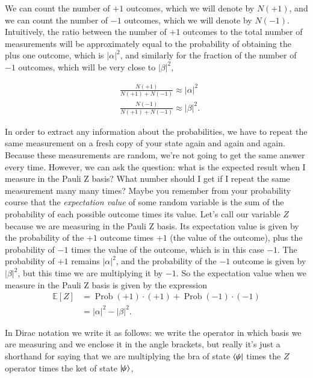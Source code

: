 We can count the number of $+1$ outcomes, which we will denote by $N(+1)$, and we can count the number of $-1$ outcomes, which we will denote by $N(-1)$. Intuitively, the ratio between the number of $+1$ outcomes to the total number of measurements will be approximately equal to the probability of obtaining the plus one outcome, which is $|\alpha|^2$, and similarly for the fraction of the number of $-1$ outcomes, which will be very close to $|\beta|^2$,

\begin{equation}
\begin{aligned}
&\frac{N(+1)}{N(+1)+N(-1)} \approx|\alpha|^{2} \\
&\frac{N(-1)}{N(+1)+N(-1)} \approx|\beta|^{2}.
\end{aligned}
\end{equation}

In order to extract any information about the probabilities, we have to repeat the same measurement on a fresh copy of your state again and again and again. Because these measurements are random, we're not going to get the same answer every time. However, we can ask the question: what is the expected result when I measure in the Pauli Z basis? What number should I get if I repeat the same measurement many many times? Maybe you remember from your probability course that the \emph{expectation value} of some random variable is the sum of the probability of each possible outcome times its value. Let's call our variable $Z$ because we are measuring in the Pauli Z basis.  Its expectation value is given by the probability of the $+1$ outcome times $+1$ (the value of the outcome), plus the probability of $-1$ times the value of the outcome, which is in this case $-1$.  The probability of $+1$ remains $|\alpha|^2$, and the probability of the $-1$ outcome is given by $|\beta|^2$, but this time we are multiplying it by $-1$. So the expectation value when we measure in the Pauli Z basis is given by the expression
\begin{equation}
\begin{aligned}
\mathbb{E}[Z] &=\operatorname{Prob}(+1) \cdot(+1)+\operatorname{Prob}(-1) \cdot(-1) \\
&=|\alpha|^{2}-|\beta|^{2}.
\end{aligned}
\end{equation}

In Dirac notation we write it as follows: we write the operator in which basis we are measuring and we enclose it in the angle brackets, but really it's just a shorthand for saying that we are multiplying the bra of state $\bra{\psi}$ times the $Z$ operator times the ket of state $\ket{\psi}$,

